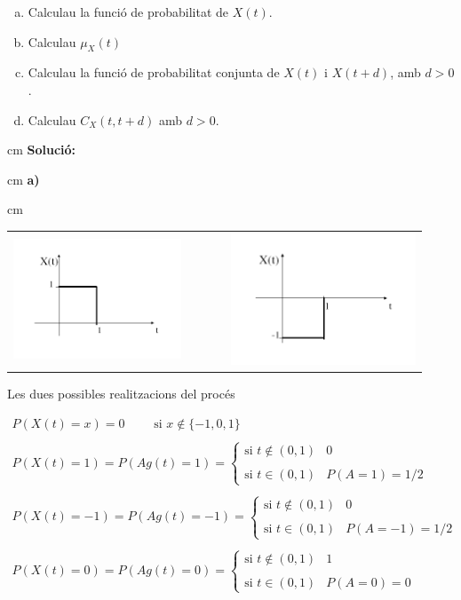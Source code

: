\documentclass{article}
\begin{document}
\begin{enumerate}[a)]
\item Calculau la funci\'o de probabilitat de $X(t)$.
\item Calculau $\mu_{X}(t)$
\item Calculau la funci\'o de probabilitat conjunta  de $X(t)$ i
$X(t+d)$, amb $d > 0$.
\item Calculau  $C_{X}(t,t+d)$ amb $d>0$.
\end{enumerate}

 cm
\noindent
\textbf{Soluci\'o:}

 cm
\noindent
\textbf{a)} 

 cm
\begin{center}
\begin{tabular}{ccc}
\includegraphics[width=5cm]{figprob3T3a.png}
&
$\qquad$
&
\includegraphics[width=5.5cm]{figprob3T3b.png} 
\end{tabular}

Les dues possibles realitzacions del proc\'es
\end{center}
 
\[
\begin{array}{l}
P(X(t) = x) = 0 \qquad \text{ si } x \notin \{-1, 0, 1 \} \\ \\
P(X(t) = 1)=P(Ag(t) = 1)=\begin{cases} \text{si } t \notin (0, 1) & 0 \\ \\ \text{si } t \in (0, 1) & P(A=1)=1/2 \end{cases} \\ \\
P(X(t) = -1)=P(Ag(t) = -1)=\begin{cases} \text{si } t \notin (0, 1) & 0 \\ \\ \text{si } t \in (0, 1) & P(A=-1)=1/2 \end{cases} \\ \\
P(X(t) = 0)=P(Ag(t) = 0)=\begin{cases} \text{si } t \notin (0, 1) & 1 \\ \\ \text{si } t \in (0, 1) & P(A=0)=0 \end{cases} 
\end{array}
\]
\end{document}
